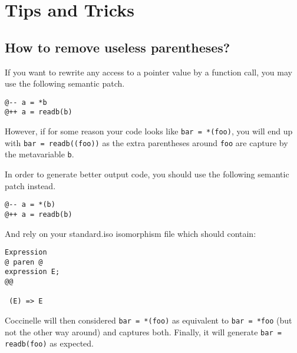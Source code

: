 
\section{Tips and Tricks}

\subsection{How to remove useless parentheses?}

If you want to rewrite any access to a pointer value by a function
call, you may use the following semantic patch.

\begin{lstlisting}[language=Cocci]
@-- a = *b
@++ a = readb(b)
\end{lstlisting}

However, if for some reason your code looks like \verb|bar = *(foo)|,
you will end up with \verb|bar = readb((foo))| as the extra
parentheses around \texttt{foo} are capture by the metavariable
\texttt{b}.

In order to generate better output code, you should use the following
semantic patch instead.
\begin{lstlisting}[language=Cocci]
@-- a = *(b)
@++ a = readb(b)
\end{lstlisting}

And rely on your standard.iso isomorphism file which should contain:
\begin{lstlisting}[language=Cocci]
Expression
@ paren @
expression E;
@@

 (E) => E
\end{lstlisting}

Coccinelle will then considered \verb|bar = *(foo)| as equivalent to
\verb|bar = *foo| (but not the other way around) and captures both.
Finally, it will generate \verb|bar = readb(foo)| as expected.

